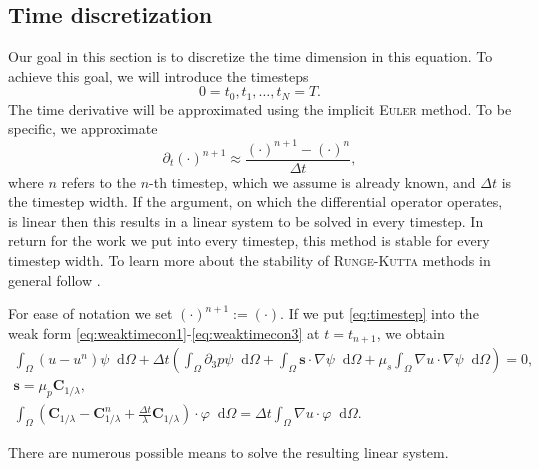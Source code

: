 \documentclass[12pt,a4paper,twoside, open=right]{scrreprt}
\theoremstyle{definition}
\theoremstyle{plain}
\newcommand{\bfs}{\bm{s}}
\newcommand{\bfC}{\bm{C}}
\newcommand{\D}{\mathop{}\!\mathrm{d}}
\begin{document}
\subsection{Time discretization}
Our goal in this section is to discretize the time dimension in this equation. To achieve this goal, we will introduce the timesteps
\begin{equation}
    0=t_0,t_1,\dotsc,t_N=T.
\end{equation}
The time derivative will be approximated using the implicit \textsc{Euler} method. To be specific, we approximate 
\begin{equation}
    \partial_t(\cdot)^{n+1}\approx\frac{(\cdot)^{n+1}-(\cdot)^n}{\Delta t},\label{eq:timestep}
\end{equation}
where $n$ refers to the $n$-th timestep, which we assume is already known, and $\Delta t$ is the timestep width. If the argument, on which the differential operator operates, is linear then this results in a linear system to be solved in every timestep. In return for the work we put into every timestep, this method is stable for every timestep width. To learn more about the stability of \textsc{Runge-Kutta} methods in general follow \cite{Hairer1986}.
\par 
For ease of notation we set $(\cdot)^{n+1}:=(\cdot)$. If we put \eqref{eq:timestep} into the weak form \eqref{eq:weaktimecon1}-\eqref{eq:weaktimecon3} at $t=t_{n+1}$, we obtain 
\begin{align}
\label{eq:timedisc1}
  \int_\Omega(u-u^n)\psi\D\Omega +\Delta t\left(\int_\Omega\partial_3 p\psi\D\Omega + \int_\Omega\bfs\cdot\nabla\psi\D\Omega+\mu_s\int_\Omega\nabla u\cdot\nabla\psi\D\Omega\right) = 0,\\
  \label{eq:timedisc2}
  \bfs =\mu_p\bfC_{1/\lambda},\\
  \label{eq:timedisc3}
  \int_\Omega(\bfC_{1/\lambda} - \bfC_{1/\lambda}^n +\frac{\Delta t}{\lambda}\bfC_{1/\lambda})\cdot\varphi\D\Omega = 
  \Delta t\int_\Omega\nabla u\cdot\varphi\D\Omega.
\end{align}
\par 
There are numerous possible means to solve the resulting linear system. 
\end{document}
